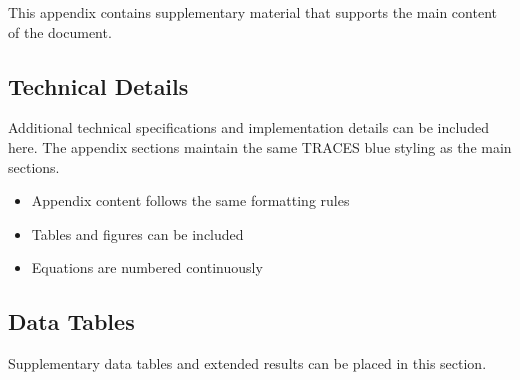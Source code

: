 \documentclass[10pt]{tracesdoc}
\begin{document}
This appendix contains supplementary material that supports the main content of the document.

\subsection{Technical Details}

Additional technical specifications and implementation details can be included here. The appendix sections maintain the same TRACES blue styling as the main sections.

\begin{itemize}
    \item Appendix content follows the same formatting rules
    \item Tables and figures can be included
    \item Equations are numbered continuously
\end{itemize}

\subsection{Data Tables}

Supplementary data tables and extended results can be placed in this section.
\end{document}
